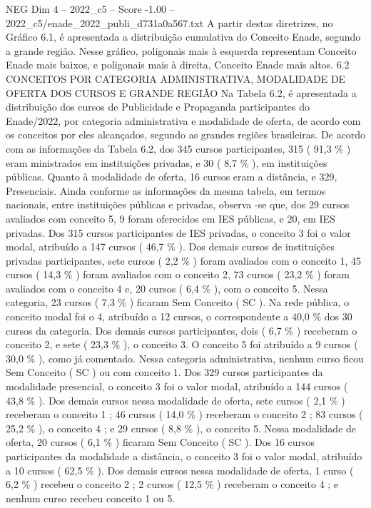 \begin{textsample}{NEG Dim 4 – 2022\_c5 – Score -1.00 – 2022\_c5/enade\_2022\_publi\_d731a0a567.txt}
A partir destas diretrizes, no Gráfico 6.1, é apresentada a distribuição cumulativa do Conceito Enade, segundo a grande região.
Nesse gráfico, poligonais mais à esquerda representam Conceito Enade mais baixos, e poligonais mais à direita, Conceito Enade mais altos. 6.2 CONCEITOS POR CATEGORIA ADMINISTRATIVA, MODALIDADE DE OFERTA DOS CURSOS E GRANDE REGIÃO Na Tabela 6.2, é apresentada a distribuição dos cursos de Publicidade e Propaganda participantes do Enade/2022, por categoria administrativa e modalidade de oferta, de acordo com os conceitos por eles alcançados, segundo as grandes regiões brasileiras.
De acordo com as informações da Tabela 6.2, dos 345 cursos participantes, 315 ( 91,3 \% ) eram ministrados em instituições privadas, e 30 ( 8,7 \% ), em instituições públicas.
Quanto à modalidade de oferta, 16 cursos eram a distância, e 329, Presenciais.
Ainda conforme as informações da mesma tabela, em termos nacionais, entre instituições públicas e privadas, observa -se que, dos 29 cursos avaliados com conceito 5, 9 foram oferecidos em IES públicas, e 20, em IES privadas.
Dos 315 cursos participantes de IES privadas, o conceito 3 foi o valor modal, atribuído a 147 cursos ( 46,7 \% ).
Dos demais cursos de instituições privadas participantes, sete cursos ( 2,2 \% ) foram avaliados com o conceito 1, 45 cursos ( 14,3 \% ) foram avaliados com o conceito 2, 73 cursos ( 23,2 \% ) foram avaliados com o conceito 4 e, 20 cursos ( 6,4 \% ), com o conceito 5.
Nessa categoria, 23 cursos ( 7,3 \% ) ficaram Sem Conceito ( SC ).
Na rede pública, o conceito modal foi o 4, atribuído a 12 cursos, o correspondente a 40,0 \% dos 30 cursos da categoria.
Dos demais cursos participantes, dois ( 6,7 \% ) receberam o conceito 2, e sete ( 23,3 \% ), o conceito 3.
O conceito 5 foi atribuído a 9 cursos ( 30,0 \% ), como já comentado.
Nessa categoria administrativa, nenhum curso ficou Sem Conceito ( SC ) ou com conceito 1.
Dos 329 cursos participantes da modalidade presencial, o conceito 3 foi o valor modal, atribuído a 144 cursos ( 43,8 \% ).
Dos demais cursos nessa modalidade de oferta, sete cursos ( 2,1 \% ) receberam o conceito 1 ; 46 cursos ( 14,0 \% ) receberam o conceito 2 ; 83 cursos ( 25,2 \% ), o conceito 4 ; e 29 cursos ( 8,8 \% ), o conceito 5.
Nessa modalidade de oferta, 20 cursos ( 6,1 \% ) ficaram Sem Conceito ( SC ).
Dos 16 cursos participantes da modalidade a distância, o conceito 3 foi o valor modal, atribuído a 10 cursos ( 62,5 \% ).
Dos demais cursos nessa modalidade de oferta, 1 curso ( 6,2 \% ) recebeu o conceito 2 ; 2 cursos ( 12,5 \% ) receberam o conceito 4 ; e nenhum curso recebeu conceito 1 ou 5.

\end{textsample}
